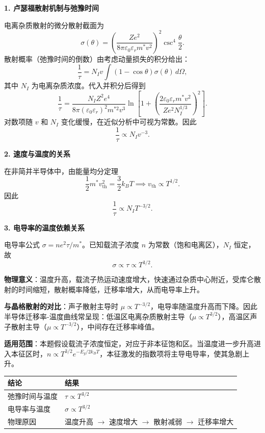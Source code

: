 \begin{derivationbox}[标准解题过程]
\textbf{1. 卢瑟福散射机制与弛豫时间}

电离杂质散射的微分散射截面为
\[
\sigma(\theta)=\left(\frac{Ze^2}{8\pi\varepsilon_0\varepsilon_rm^*v^2}\right)^2\csc^4\frac{\theta}{2}.
\]
散射概率（弛豫时间的倒数）由考虑动量损失的积分给出：
\[
\frac{1}{\tau}=N_Iv\int(1-\cos\theta)\sigma(\theta)\,d\Omega,
\]
其中 $N_I$ 为电离杂质浓度。代入并积分后得到
\[
\frac{1}{\tau}=\frac{N_I Z^2e^4}{8\pi(\varepsilon_0\varepsilon_r)^2m^{*2}v^3}\ln\left[1+\left(\frac{2\varepsilon_0\varepsilon_rm^*v^2}{Ze^2N_I^{1/3}}\right)^2\right].
\]
对数项随 $v$ 和 $N_I$ 变化缓慢，在近似分析中可视为常数。因此
\[
\frac{1}{\tau}\propto N_Iv^{-3}.
\]

\textbf{2. 速度与温度的关系}

在非简并半导体中，由能量均分定理
\[
\frac{1}{2}m^*v_{\text{th}}^2=\frac{3}{2}k_BT\implies v_{\text{th}}\propto T^{1/2}.
\]
因此
\[
\frac{1}{\tau}\propto N_IT^{-3/2}.
\]

\textbf{3. 电导率的温度依赖关系}

电导率公式 $\sigma=ne^2\tau/m^*$。已知载流子浓度 $n$ 为常数（饱和电离区），$N_I$ 恒定，故
\begin{equation}
\boxed{\sigma\propto\tau\propto T^{3/2}.}
\end{equation}

\textbf{物理意义}：温度升高，载流子热运动速度增大，快速通过杂质中心附近，受库仑散射的时间缩短，散射概率降低，迁移率增大，从而电导率上升。

\textbf{与晶格散射的对比}：声子散射主导时 $\mu\propto T^{-3/2}$，电导率随温度升高而下降。因此半导体迁移率-温度曲线常呈现：低温区电离杂质散射主导（$\mu\propto T^{3/2}$），高温区声子散射主导（$\mu\propto T^{-3/2}$），中间存在迁移率峰值。

\textbf{适用范围}：本题假设载流子浓度恒定，对应于非本征饱和区。当温度进一步升高进入本征区时，$n\propto T^{3/2}e^{-E_g/2k_BT}$，本征激发的指数项将主导电导率，使其急剧上升。
\end{derivationbox}

\begin{formulabox}[答案汇总]
\begin{center}
\begin{tabular}{ll}
\toprule
\textbf{结论} & \textbf{结果} \\
\midrule
弛豫时间与温度 & $\tau\propto T^{3/2}$ \\
电导率与温度 & $\sigma\propto T^{3/2}$ \\
物理原因 & 温度升高 $\to$ 速度增大 $\to$ 散射减弱 $\to$ 迁移率增大 \\
\bottomrule
\end{tabular}
\end{center}
\end{formulabox}

